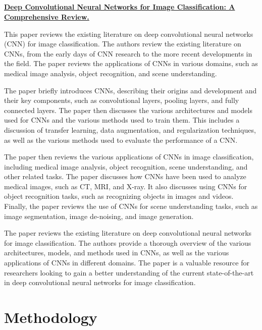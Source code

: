 \documentclass[conference]{IEEEtran}
\begin{document}
\subsection{}\href{https://ieeexplore.ieee.org/abstract/document/8016501/authors#authors}{{\textbf{\textbf{Deep Convolutional Neural Networks for Image Classification: A Comprehensive Review.}}}}

This paper reviews the existing literature on deep convolutional neural networks (CNN) for image classification. The authors review the existing literature on CNNs, from the early days of CNN research to the more recent developments in the field. The paper reviews the applications of CNNs in various domains, such as medical image analysis, object recognition, and scene understanding.

The paper briefly introduces CNNs, describing their origins and development and their key components, such as convolutional layers, pooling layers, and fully connected layers. The paper then discusses the various architectures and models used for CNNs and the various methods used to train them. This includes a discussion of transfer learning, data augmentation, and regularization techniques, as well as the various methods used to evaluate the performance of a CNN.

The paper then reviews the various applications of CNNs in image classification, including medical image analysis, object recognition, scene understanding, and other related tasks. The paper discusses how CNNs have been used to analyze medical images, such as CT, MRI, and X-ray. It also discusses using CNNs for object recognition tasks, such as recognizing objects in images and videos. Finally, the paper reviews the use of CNNs for scene understanding tasks, such as image segmentation, image de-noising, and image generation.

The paper reviews the existing literature on deep convolutional neural networks for image classification. The authors provide a thorough overview of the various architectures, models, and methods used in CNNs, as well as the various applications of CNNs in different domains. The paper is a valuable resource for researchers looking to gain a better understanding of the current state-of-the-art in deep convolutional neural networks for image classification.

\section{Methodology}
\end{document}
